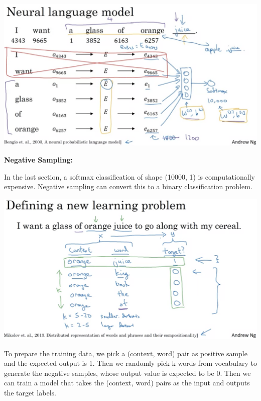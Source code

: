 \documentclass{article}
\begin{document}
\begin{center}
\includegraphics[scale=0.3]{./images/learn_embeddings.png}
\end{center}

\noindent \textbf{Negative Sampling:}

\noindent In the last section, a softmax classification of shape (10000, 1) is computationally expensive. Negative sampling can convert this to a binary classification problem.

\begin{center}
\includegraphics[scale=0.3]{./images/negative_sampling.png}
\end{center}

\noindent To prepare the training data, we pick a (context, word) pair as positive sample and the expected output is 1. Then we randomly pick k words from vocabulary to generate the negative samples, whose output value is expected to be 0. Then we can train a model that takes the (context, word) pairs as the input and outputs the target labels.
\end{document}
